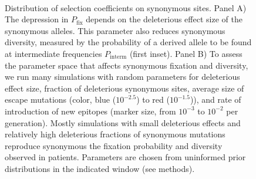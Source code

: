 \documentclass[rmp, twocolumn]{revtex4}
\begin{document}
\begin{figure}
\begin{center}
\\
\caption{Distribution of selection coefficients on synonymous sites. Panel A)
The depression in $P_\text{fix}$ depends on the deleterious effect size 
of the synonymous alleles. This parameter also reduces synonymous
diversity, measured by the probability of a derived allele to be found at
intermediate frequencies $P_\text{interm}$ (first inset).
Panel B) To assess the parameter space that affects synonymous fixation and
diversity, we run many simulations with random parameters for deleterious effect
size, fraction of deleterious synonymous sites, average size of escape
mutations (color, blue ($10^{-2.5}$) to red ($10^{-1.5}$)), and rate of
introduction of new epitopes (marker size, from $10^{-3}$ to $10^{-2}$ per
generation). Mostly simulations with small deleterious effects and relatively
high deleterious fractions of synonymous mutations reproduce synonymous the
fixation probability and diversity observed in patients. Parameters are chosen
from uninformed prior distributions in the indicated window (see methods).}
\label{fig:simheat}
\end{center}
\end{figure}
\end{document}

